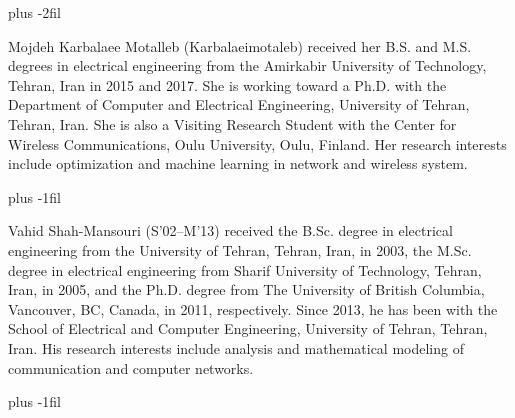  \vskip 0pt plus -2fil
 \begin{IEEEbiography}
 { Mojdeh Karbalaee Motalleb (Karbalaeimotaleb)} received her B.S. and M.S. degrees in electrical engineering from the Amirkabir University of Technology, Tehran, Iran in 2015 and 2017. She is working toward a Ph.D. with the Department of Computer and Electrical Engineering, University of Tehran, Tehran, Iran. She is also a Visiting Research Student with the Center for Wireless Communications, Oulu University, Oulu, Finland. Her research interests include optimization and machine learning in network and wireless system.
 \end{IEEEbiography}
  \vskip 0pt plus -1fil
\begin{IEEEbiography}{Vahid Shah-Mansouri}%
(S’02–M’13) received the B.Sc. degree in electrical
engineering from the University of Tehran, Tehran, Iran, in 2003,
the M.Sc. degree in electrical engineering from Sharif University
of Technology, Tehran, Iran, in 2005, and the Ph.D. degree from The
University of British Columbia, Vancouver, BC, Canada, in 2011,
respectively. Since 2013, he has been with the
School of Electrical and Computer Engineering, University of Tehran,
Tehran, Iran. His research interests include analysis and mathematical
modeling of communication and computer networks.
\end{IEEEbiography}
 \vskip 0pt plus -1fil
